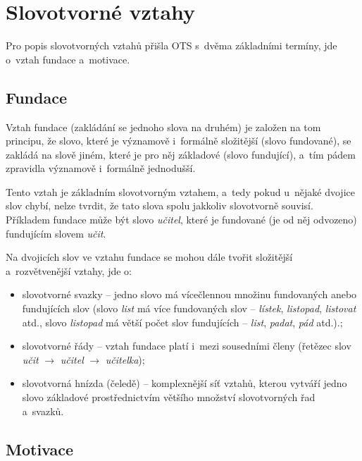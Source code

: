 \hypertarget{slovotvornuxe9-vztahy}{%
\section{Slovotvorné vztahy}\label{slovotvornuxe9-vztahy}}

Pro popis slovotvorných vztahů přišla OTS s~dvěma základními termíny,
jde o~vztah fundace a~motivace.

\hypertarget{fundace}{%
\subsection{Fundace}\label{fundace}}

Vztah fundace (zakládání se jednoho slova na druhém) je založen na tom
principu, že slovo, které je významově i~formálně složitější (slovo
fundované), se zakládá na slově jiném, které je pro něj základové (slovo
fundující), a~tím pádem zpravidla významově i~formálně jednodušší.
\parencite[95]{dokulil00}

Tento vztah je základním slovotvorným vztahem, a~tedy pokud u~nějaké
dvojice slov chybí, nelze tvrdit, že tato slova spolu jakkoliv
slovotvorně souvisí. Příkladem fundace může být slovo \emph{učitel},
které je fundované (je od něj odvozeno) fundujícím slovem \emph{učit}.

Na dvojicích slov ve vztahu fundace se mohou dále tvořit složitější
a~rozvětvenější vztahy, jde o:

\begin{itemize}
\tightlist
\item
  slovotvorné svazky -- jedno slovo má vícečlennou množinu fundovaných
  anebo fundujících slov (slovo \emph{list} má více fundovaných slov --
  \emph{lístek}, \emph{listopad}, \emph{listovat} atd., slovo
  \emph{listopad} má větší počet slov fundujících -- \emph{list},
  \emph{padat}, \emph{pád} atd.).;
\item
  slovotvorné řády -- vztah fundace platí i~mezi sousedními členy
  (řetězec slov \emph{učit} $\rightarrow$ \emph{učitel}
  $\rightarrow$ \emph{učitelka});
\item
  slovotvorná hnízda (čeledě) -- komplexnější síť vztahů, kterou vytváří
  jedno slovo základové prostřednictvím většího množství slovotvorných
  řad a~svazků.~\parencite[12--13]{dokulil62}
\end{itemize}

\hypertarget{motivace}{%
\subsection{Motivace}\label{motivace}}

